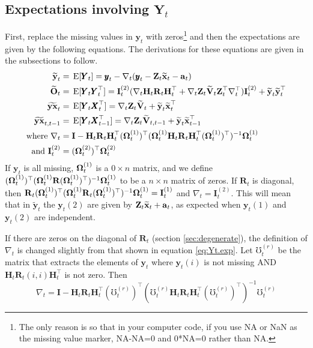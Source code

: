 \documentclass[]{article}
\def\OMG{\mbox{\boldmath $\Omega$}}
\def\XI{\mbox{\boldmath $\Xi$}}
\def\E{\,\textup{\textrm{E}}}
\def\HH{\mbox{$\mathbf H$}}	\def\hh{\mbox{$\mathbf h$}}
\def\II{\mbox{$\mathbf I$}} \def\ii{\mbox{$\mathbf i$}}
\def\IIm{\mbox{$\mathbf I$}}
\def\OO{\mbox{$\mathbf O$}}
\def\RR{\mbox{$\mathbf R$}}	 \def\rr{\mbox{$\mathbf r$}} \def\Rb{\mbox{$\mathbf H$}}	\def\Rm{\mathbb{R}}
\def\VV{\mbox{$\mathbf V$}}	\def\vv{\mbox{$\mathbf v$}}
\def\XX{\mbox{$\pmb{X}$}}	\def\xx{\mbox{$\pmb{x}$}}
\def\YY{\mbox{$\pmb{Y}$}}	\def\yy{\mbox{$\pmb{y}$}}
\def\ZZ{\mbox{$\mathbf Z$}}	\def\zz{\mbox{$\mathbf z$}}	\def\Zb{\mbox{$\mathbf M$}} \def\Za{\mbox{$\mathbf N$}} \def\Zm{\XI}
\def\hatxt{\widetilde{\mbox{$\mathbf x$}}_t}
\def\hatxtm{\widetilde{\mbox{$\mathbf x$}}_{t-1}}
\def\hatyt{\widetilde{\mbox{$\mathbf y$}}_t}
\def\hatOt{\widetilde{\OO}_t}
\def\hatYXt{\widetilde{\mbox{$\mathbf{y}\mathbf{x}$}}_t}
\def\hatYXttm{\widetilde{\mbox{$\mathbf{y}\mathbf{x}$}}_{t,t-1}}
\def\hatVt{\widetilde{\VV}_t}
\def\hatVttm{\widetilde{\VV}_{t,t-1}}
\def\IR{\nabla}
\begin{document}
\subsection{Expectations involving $\YY_t$}\label{sec:exp.Y}
First, replace the missing values in $\yy_t$ with zeros\footnote{The only reason is so that in your computer code, if you use NA or NaN as the missing value marker, NA-NA=0 and 0*NA=0 rather than NA.} and then the expectations are given by the following equations.  The derivations for these equations are given in the subsections to follow.
\begin{subequations}\label{eq:Yt.exp}
\begin{align}
\hatyt &= \E[\YY_t]=\yy_t-\IR_t(\yy_t-\ZZ_t\hatxt-\aa_t)\label{eq:hatyt}\\
\hatOt &= \E[\YY_t\YY_t^\top]=\IIm_t^{(2)}(\IR_t\HH_t\RR_t\HH_t^\top + \IR_t\ZZ_t\hatVt\ZZ_t^\top\IR_t^\top)\IIm_t^{(2)}  +  \hatyt\hatyt^\top \label{eq:hatOt}\\
\hatYXt&= \E[\YY_t\XX_t^\top] = \IR_t\ZZ_t\hatVt + \hatyt\hatxt^\top \label{eq:hatyxttm}\\
\hatYXttm&= \E[\YY_t\XX_{t-1}^\top] = \IR_t\ZZ_t\hatVttm + \hatyt\hatxtm^\top \label{eq:hatyxt}\\
\text{where }\IR_t &= \II-\HH_t\RR_t\HH_t^\top(\OMG_t^{(1)})^\top(\OMG_t^{(1)}\HH_t\RR_t\HH_t^\top(\OMG_t^{(1)})^\top)^{-1}\OMG_t^{(1)}\label{eq.IRt}\\
\text{and }\IIm_t^{(2)}&=(\OMG_t^{(2)})^\top\OMG_t^{(2)}
\label{eq:IRt}
\end{align}
\end{subequations}
If $\yy_t$ is all missing, $\OMG_t^{(1)}$ is a $0 \times n$ matrix, and we define $(\OMG_t^{(1)})^\top(\OMG_t^{(1)}\RR(\OMG_t^{(1)})^\top)^{-1}\OMG_t^{(1)}$ to be a $n \times n$ matrix of zeros.  If $\RR_t$ is diagonal, then $\RR_t(\OMG_t^{(1)})^\top(\OMG_t^{(1)}\RR_t(\OMG_t^{(1)})^\top)^{-1}\OMG_t^{(1)}=\IIm_t^{(1)}$ and $\IR_t=\IIm_t^{(2)}$.  This will mean that in $\hatyt$ the $\yy_t(2)$ are given by $\ZZ_t\hatxt+\aa_t$, as expected when $\yy_t(1)$ and $\yy_t(2)$ are independent.

If there are zeros on the diagonal of $\RR_t$ (section \ref{sec:degenerate}), the definition of $\IR_t$ is changed slightly from that shown in equation \ref{eq:Yt.exp}. Let $\mho_t^{(r)}$ be the matrix that extracts the elements of $\yy_t$ where $\yy_t(i)$ is not missing AND $\HH_t\RR_t(i,i)\HH_t^\top$ is not zero. Then
\begin{equation}
\IR_t = \II-\HH_t\RR_t\HH_t^\top(\mho_t^{(r)})^\top
(\mho_t^{(r)}\HH_t\RR_t\HH_t^\top(\mho_t^{(r)})^\top)^{-1}\mho_t^{(r)}
\label{eq:IRt.degen}
\end{equation}
\end{document}
